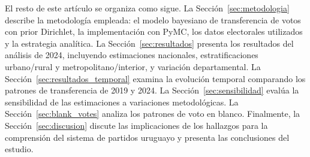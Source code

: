 El resto de este artículo se organiza como sigue. La Sección~\ref{sec:metodologia} describe la metodología empleada: el modelo bayesiano de transferencia de votos con prior Dirichlet, la implementación con PyMC, los datos electorales utilizados y la estrategia analítica. La Sección~\ref{sec:resultados} presenta los resultados del análisis de 2024, incluyendo estimaciones nacionales, estratificaciones urbano/rural y metropolitano/interior, y variación departamental. La Sección~\ref{sec:resultados_temporal} examina la evolución temporal comparando los patrones de transferencia de 2019 y 2024. La Sección~\ref{sec:sensibilidad} evalúa la sensibilidad de las estimaciones a variaciones metodológicas. La Sección~\ref{sec:blank_votes} analiza los patrones de voto en blanco. Finalmente, la Sección~\ref{sec:discusion} discute las implicaciones de los hallazgos para la comprensión del sistema de partidos uruguayo y presenta las conclusiones del estudio.

